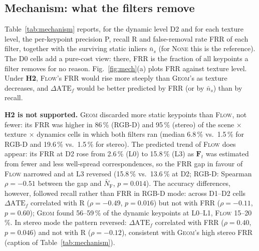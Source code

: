 \documentclass[conference]{IEEEtran}
\newcommand{\none}{\textsc{None}}
\newcommand{\flow}{\textsc{Flow}}
\newcommand{\geom}{\textsc{Geom}}
\newcommand{\hyp}[1]{\textbf{H#1}}
\newcommand{\NFAST}{\bar{N}_{\mathrm{F}}}
\begin{document}
\subsection{Mechanism: what the filters remove}
\label{sec:mechanism}
Table~\ref{tab:mechanism} reports, for the dynamic level D2 and for each texture level, the per-keypoint precision P, recall R and false-removal rate FRR of each filter, together with the surviving static inliers $\bar{n}_s$ (for \none{} this is the reference). The D0 cells add a pure-cost view: there, FRR is the fraction of all keypoints a filter removes for no reason. Fig.~\ref{fig:mech}(a) plots FRR against texture level. Under \hyp{2}, \flow{}'s FRR would rise more steeply than \geom{}'s as texture decreases, and $\Delta\mathrm{ATE}_f$ would be better predicted by FRR (or by $\bar{n}_s$) than by recall.

\textbf{\hyp{2} is not supported.} \geom{} discarded more static keypoints than \flow{}, not fewer: its FRR was higher in 86\,\% (RGB-D) and 95\,\% (stereo) of the scene $\times$ texture $\times$ dynamics cells in which both filters ran (median 6.8\,\% vs.\ 1.5\,\% for RGB-D and 19.6\,\% vs.\ 1.5\,\% for stereo). The predicted trend of \flow{} does appear: its FRR at D2 rose from 2.6\,\% (L0) to 15.8\,\% (L3) as $\mathbf{F}_t$ was estimated from fewer and less well-spread correspondences, so the FRR gap in favour of \flow{} narrowed and at L3 reversed (15.8\,\% vs.\ 13.6\,\% at D2; RGB-D: Spearman $\rho=-0.51$ between the gap and $\NFAST$, $p=0.014$). The accuracy differences, however, followed recall rather than FRR in RGB-D mode: across D1--D2 cells $\Delta\mathrm{ATE}_f$ correlated with R ($\rho=-0.49$, $p=0.016$) but not with FRR ($\rho=-0.11$, $p=0.60$); \geom{} found 56--59\,\% of the dynamic keypoints at L0--L1, \flow{} 15--20\,\%. In stereo mode the pattern reversed: $\Delta\mathrm{ATE}_f$ correlated with FRR ($\rho=0.40$, $p=0.046$) and not with R ($\rho=-0.12$), consistent with \geom{}'s high stereo FRR (caption of Table~\ref{tab:mechanism}).
\end{document}
